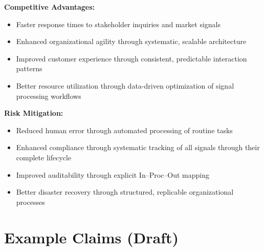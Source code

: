 \documentclass[11pt,a4paper]{article}
\begin{document}
\textbf{Competitive Advantages:}
\begin{itemize}[noitemsep]
  \item Faster response times to stakeholder inquiries and market signals
  \item Enhanced organizational agility through systematic, scalable architecture
  \item Improved customer experience through consistent, predictable interaction patterns
  \item Better resource utilization through data-driven optimization of signal processing workflows
\end{itemize}

\textbf{Risk Mitigation:}
\begin{itemize}[noitemsep]
  \item Reduced human error through automated processing of routine tasks
  \item Enhanced compliance through systematic tracking of all signals through their complete lifecycle
  \item Improved auditability through explicit In--Proc--Out mapping
  \item Better disaster recovery through structured, replicable organizational processes
\end{itemize}

\section*{Example Claims (Draft)}
\end{document}
